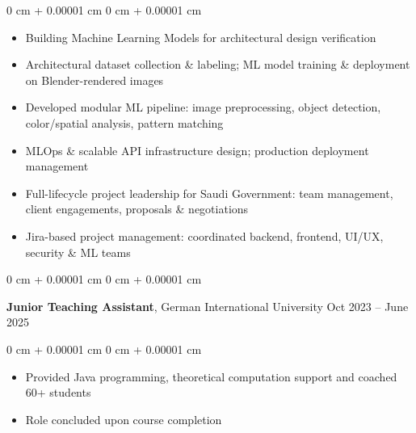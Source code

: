 \documentclass[10pt, letterpaper]{article}
\newenvironment{highlights}{
    \begin{itemize}[
        topsep=0.10 cm,
        parsep=0.10 cm,
        partopsep=0pt,
        itemsep=0pt,
        leftmargin=0 cm + 10pt
    ]
}{
    \end{itemize}
} %
\newenvironment{onecolentry}{
    \begin{adjustwidth}{
        0 cm + 0.00001 cm
    }{
        0 cm + 0.00001 cm
    }
}{
    \end{adjustwidth}
} %
\newenvironment{twocolentry}[2][]{
    \onecolentry
    \def\secondColumn{#2}
    \setcolumnwidth{\fill, 4.5 cm}
    \begin{paracol}{2}
}{
    \switchcolumn \raggedleft \secondColumn
    \end{paracol}
    \endonecolentry
} %
\begin{document}
        \vspace{0.10 cm}
        \begin{onecolentry}
            \begin{highlights}
                \item Building Machine Learning Models for architectural design verification
                \item Architectural dataset collection \& labeling; ML model training \& deployment on Blender-rendered images
                \item Developed modular ML pipeline: image preprocessing, object detection, color/spatial analysis, pattern matching
                \item MLOps \& scalable API infrastructure design; production deployment management
                \item Full-lifecycle project leadership for Saudi Government: team management, client engagements, proposals \& negotiations
                \item Jira-based project management: coordinated backend, frontend, UI/UX, security \& ML teams
            \end{highlights}
        \end{onecolentry}

        \vspace{0.2 cm}

        \begin{twocolentry}{
            Oct 2023 – June 2025
        }
            \textbf{Junior Teaching Assistant}, German International University\end{twocolentry}

        \vspace{0.10 cm}
        \begin{onecolentry}
            \begin{highlights}
                \item Provided Java programming, theoretical computation   support and coached 60+ students
                \item Role concluded upon course completion
            \end{highlights}
        \end{onecolentry}
\end{document}
